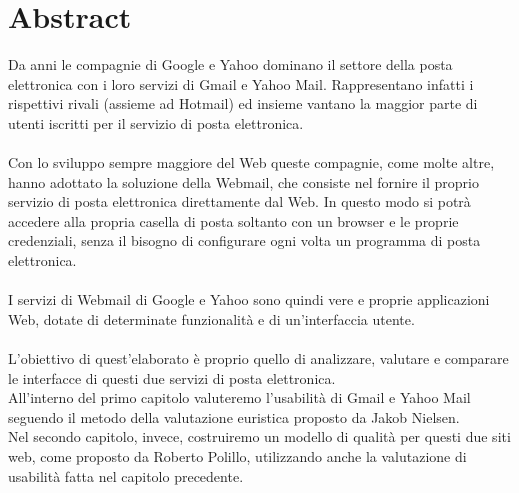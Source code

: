 \cleardoublepage
{}
\chapter*{Abstract}

	Da anni le compagnie di Google e Yahoo dominano il settore della posta elettronica con i loro servizi di Gmail e Yahoo Mail. Rappresentano infatti i rispettivi rivali (assieme ad Hotmail) ed insieme vantano la maggior parte di utenti iscritti per il servizio di posta elettronica.\\
	\\
	Con lo sviluppo sempre maggiore del Web queste compagnie, come molte altre, hanno adottato la soluzione della Webmail, che consiste nel fornire il proprio servizio di posta elettronica direttamente dal Web. In questo modo si potrà accedere alla propria casella di posta soltanto con un browser e le proprie credenziali, senza il bisogno di configurare ogni volta un programma di posta elettronica.\\
	\\
	I servizi di Webmail di Google e Yahoo sono quindi vere e proprie applicazioni Web, dotate di determinate funzionalità e di un'interfaccia utente.\\
	\\
	L'obiettivo di quest'elaborato è proprio quello di analizzare, valutare e comparare le interfacce di questi due servizi di posta elettronica.\\
	All'interno del primo capitolo valuteremo l'usabilità di Gmail e Yahoo Mail seguendo il metodo della valutazione euristica proposto da Jakob Nielsen.\\
	Nel secondo capitolo, invece, costruiremo un modello di qualità per questi due siti web, come proposto da Roberto Polillo, utilizzando anche la valutazione di usabilità fatta nel capitolo precedente.
	
